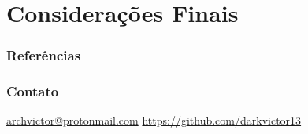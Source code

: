 \documentclass[12pt]{beamer}
\begin{document}
\section{Considerações Finais}
\begin{frame}[allowframebreaks]
    \frametitle{Referências}
    
\end{frame}

\begin{frame}
    \frametitle{Contato}
    \centering
    \url{archvictor@protonmail.com}
    \url{https://github.com/darkvictor13}
\end{frame}
\end{document}
